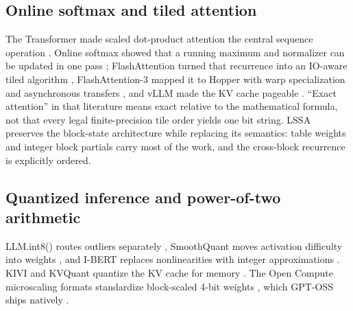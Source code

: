 \documentclass{article}
\begin{document}
\subsection{Online softmax and tiled attention}

The Transformer made scaled dot-product attention the central sequence operation
\cite{vaswani2017attention}.  Online softmax showed that a running maximum and normalizer can
be updated in one pass \cite{milakov2018online}; FlashAttention turned that recurrence into
an IO-aware tiled algorithm \cite{dao2022flashattention}, FlashAttention-3 mapped it to
Hopper with warp specialization and asynchronous transfers \cite{shah2024flashattention3},
and vLLM made the KV cache pageable \cite{kwon2023pagedattention}.  ``Exact attention'' in
that literature means exact relative to the mathematical formula, not that every legal
finite-precision tile order yields one bit string.  LSSA preserves the block-state
architecture while replacing its semantics: table weights and integer block partials carry
most of the work, and the cross-block recurrence is explicitly ordered.

\subsection{Quantized inference and power-of-two arithmetic}

LLM.int8() routes outliers separately \cite{dettmers2022llmint8}, SmoothQuant moves
activation difficulty into weights \cite{xiao2023smoothquant}, and I-BERT replaces
nonlinearities with integer approximations \cite{kim2021ibert}.  KIVI and KVQuant quantize
the KV cache for memory \cite{kivi2024,kvquant2024}.  The Open Compute microscaling formats
standardize block-scaled 4-bit weights \cite{mxfp4}, which GPT-OSS ships natively
\cite{gptoss2025}.
\end{document}
